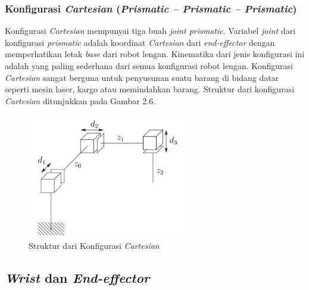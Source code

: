 \subsubsection{Konfigurasi \textit{Cartesian} (\textit{Prismatic – Prismatic – Prismatic})  } 

Konfigurasi \textit{Cartesian} mempunyai tiga buah \textit{joint prismatic}. Variabel \textit{joint} dari konfigurasi \textit{prismatic} adalah koordinat \textit{Cartesian} dari \textit{end-effector} dengan memperhatikan letak \textit{base} dari robot lengan. Kinematika dari jenis konfigurasi ini adalah yang paling sederhana dari semua konfigurasi robot lengan. Konfigurasi \textit{Cartesian} sangat berguna untuk penyusunan suatu barang di bidang datar seperti mesin laser, kargo atau memindahkan barang. Struktur dari konfigurasi \textit{Cartesian} ditunjukkan pada Gambar 2.6.

	\begin{figure}[H]
	\centering
	\includegraphics[width=7cm]{gambar/cartesian.jpg}
	\caption{Struktur dari Konfigurasi \textit{Cartesian}}
\end{figure}

\subsection{ \textit{Wrist} dan \textit{End-effector} }

